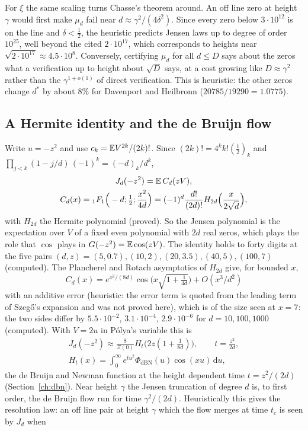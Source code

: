 For $\xi$ the same scaling turns Chasse's theorem around. An off line zero at height $\gamma$ would first make $\mu_d$ fail near $d\approx\gamma^2/(4\delta^2)$. Since every zero below $3\cdot10^{12}$ is on the line and $\delta<\frac12$, the heuristic predicts Jensen laws up to degree of order $10^{25}$, well beyond the cited $2\cdot10^{17}$, which corresponds to heights near $\sqrt{2\cdot10^{17}}\approx4.5\cdot10^8$. Conversely, certifying $\mu_d$ for all $d\le D$ says about the zeros what a verification up to height about $\sqrt D$ says, at a cost growing like $D\approx\gamma^2$ rather than the $\gamma^{1+o(1)}$ of direct verification. This is heuristic: the other zeros change $d^*$ by about $8\%$ for Davenport and Heilbronn ($20785/19290=1.0775$).

\subsection{A Hermite identity and the de Bruijn flow}
Write $u=-z^2$ and use $c_k=\mathbb{E} V^{2k}/(2k)!$. Since $(2k)!=4^kk!(\frac12)_k$ and $\prod_{j<k}(1-j/d)\,(-1)^k=(-d)_k/d^k$,
\begin{gather*}
J_d(-z^2)=\mathbb{E}\,C_d(zV),\\
C_d(x)={}_1F_1\Big(-d;\tfrac12;\frac{x^2}{4d}\Big)=(-1)^d\frac{d!}{(2d)!}H_{2d}\Big(\frac x{2\sqrt d}\Big),
\end{gather*}
with $H_{2d}$ the Hermite polynomial (proved). So the Jensen polynomial is the expectation over $V$ of a fixed even polynomial with $2d$ real zeros, which plays the role that $\cos$ plays in $G(-z^2)=\mathbb{E}\cos(zV)$. The identity holds to forty digits at the five pairs $(d,z)=(5,0.7),(10,2),(20,3.5),(40,5),(100,7)$ (computed). The Plancherel and Rotach asymptotics of $H_{2d}$ give, for bounded $x$,
\[
C_d(x)=e^{x^2/(8d)}\cos\Big(x\sqrt{1+\tfrac1{4d}}\Big)+O(x^3/d^2)
\]
with an additive error (heuristic: the error term is quoted from the leading term of Szeg\H{o}'s expansion and was not proved here), which is of the size seen at $x=7$: the two sides differ by $5.5\cdot10^{-2}$, $3.1\cdot10^{-4}$, $2.9\cdot10^{-6}$ for $d=10,100,1000$ (computed). With $V=2u$ in P\'olya's variable this is
\begin{gather*}
J_d(-z^2)\approx\frac8{\Xi(0)}H_{t}\big(2z(1+\tfrac1{8d})\big),\qquad t=\frac{z^2}{2d},\\
H_t(x)=\int_0^\infty e^{tu^2}\Phi_{\mathrm{dBN}}(u)\cos(xu)\,\mathrm{d}u,
\end{gather*}
the de Bruijn and Newman function at the height dependent time $t=z^2/(2d)$ (Section~\ref{ch:dbn}). Near height $\gamma$ the Jensen truncation of degree $d$ is, to first order, the de Bruijn flow run for time $\gamma^2/(2d)$. Heuristically this gives the resolution law: an off line pair at height $\gamma$ which the flow merges at time $t_c$ is seen by $J_d$ when
